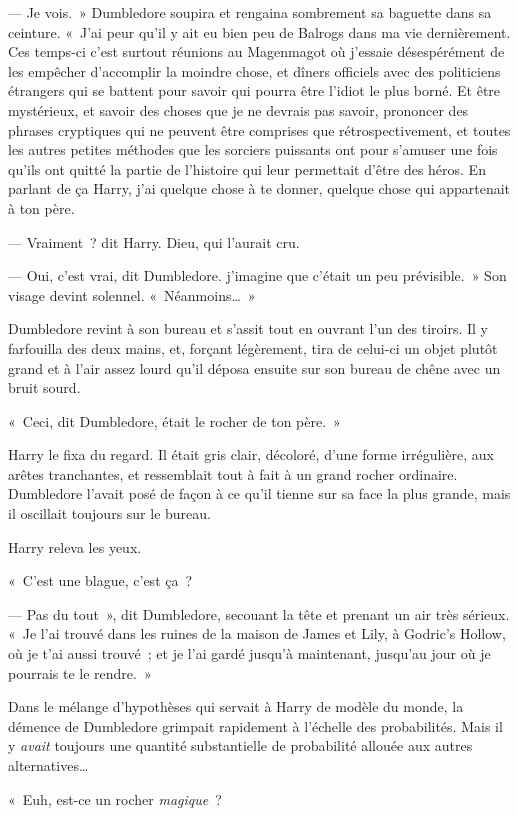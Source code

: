 --- Je vois.~» Dumbledore soupira et rengaina sombrement sa baguette dans sa ceinture. «~J'ai peur qu'il y ait eu bien peu de Balrogs dans ma vie dernièrement. Ces temps-ci c'est surtout réunions au Magenmagot où j'essaie désespérément de les empêcher d'accomplir la moindre chose, et dîners officiels avec des politiciens étrangers qui se battent pour savoir qui pourra être l'idiot le plus borné. Et être mystérieux, et savoir des choses que je ne devrais pas savoir, prononcer des phrases cryptiques qui ne peuvent être comprises que rétrospectivement, et toutes les autres petites méthodes que les sorciers puissants ont pour s'amuser une fois qu'ils ont quitté la partie de l'histoire qui leur permettait d'être des héros. En parlant de ça Harry, j'ai quelque chose à te donner, quelque chose qui appartenait à ton père.

--- Vraiment~? dit Harry. Dieu, qui l'aurait cru.

--- Oui, c'est vrai, dit Dumbledore. j'imagine que c'était un peu prévisible.~» Son visage devint solennel. «~Néanmoins…~»

Dumbledore revint à son bureau et s'assit tout en ouvrant l'un des tiroirs. Il y farfouilla des deux mains, et, forçant légèrement, tira de celui-ci un objet plutôt grand et à l'air assez lourd qu'il déposa ensuite sur son bureau de chêne avec un bruit sourd.

«~Ceci, dit Dumbledore, était le rocher de ton père.~»

Harry le fixa du regard. Il était gris clair, décoloré, d'une forme irrégulière, aux arêtes tranchantes, et ressemblait tout à fait à un grand rocher ordinaire. Dumbledore l'avait posé de façon à ce qu'il tienne sur sa face la plus grande, mais il oscillait toujours sur le bureau.

Harry releva les yeux.

«~C'est une blague, c'est ça~?

--- Pas du tout~», dit Dumbledore, secouant la tête et prenant un air très sérieux. «~Je l'ai trouvé dans les ruines de la maison de James et Lily, à Godric's Hollow, où je t'ai aussi trouvé~; et je l'ai gardé jusqu'à maintenant, jusqu'au jour où je pourrais te le rendre.~»

Dans le mélange d'hypothèses qui servait à Harry de modèle du monde, la démence de Dumbledore grimpait rapidement à l'échelle des probabilités. Mais il y \emph{avait} toujours une quantité substantielle de probabilité allouée aux autres alternatives…

«~Euh, est-ce un rocher \emph{magique}~?

